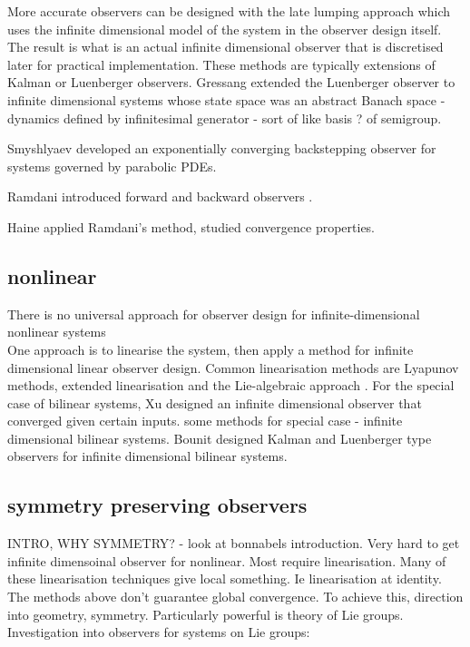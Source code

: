More accurate observers can be designed with the late lumping approach which uses the infinite dimensional model of the system in the observer design itself. The result is what is an actual infinite dimensional observer that is discretised later for practical implementation. These methods are typically extensions of Kalman or Luenberger observers. 
Gressang \cite{gressang1975observers} extended the Luenberger observer to infinite dimensional systems whose state space was an abstract Banach space - dynamics defined by infinitesimal generator - sort of like basis ? of semigroup.

Smyshlyaev \cite{smyshlyaev2005backstepping} developed an exponentially converging backstepping observer for systems governed by parabolic PDEs.

Ramdani introduced forward and backward observers \cite{ramdani2010recovering}.

Haine \cite{haine2014recovering} applied Ramdani's method, studied convergence properties.

\subsection{nonlinear}
There is no universal approach for observer design for infinite-dimensional nonlinear systems\\
One approach is to linearise the system, then apply a method for infinite dimensional linear observer design. Common linearisation methods are Lyapunov methods, extended linearisation and the Lie-algebraic approach \cite{primbs1996survey}.
For the special case of bilinear systems, Xu \cite{xu1995observer} designed an infinite dimensional observer that converged given certain inputs. some methods for special case - infinite dimensional bilinear systems. Bounit \cite{bounit1997observers} designed Kalman and Luenberger type observers for infinite dimensional bilinear systems. 

\subsection{symmetry preserving observers}
INTRO, WHY SYMMETRY? - look at bonnabels introduction. Very hard to get infinite dimensoinal observer for nonlinear. Most require linearisation. Many of these linearisation techniques give local something. Ie linearisation at identity. The methods above don't guarantee global convergence. To achieve this, direction into geometry, symmetry. Particularly powerful is theory of Lie groups.
Investigation into observers for systems on Lie groups:

